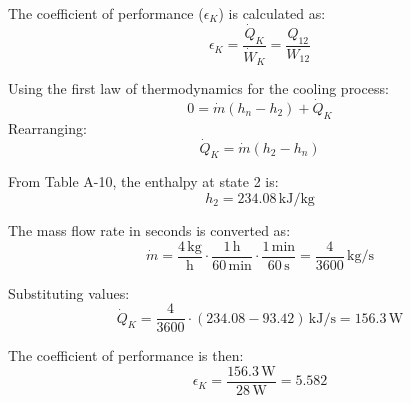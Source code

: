 The coefficient of performance (\( \epsilon_K \)) is calculated as:  
\[
\epsilon_K = \frac{\dot{Q}_K}{\dot{W}_K} = \frac{Q_{12}}{W_{12}}
\]  

Using the first law of thermodynamics for the cooling process:  
\[
0 = \dot{m} (h_n - h_2) + \dot{Q}_K
\]  
Rearranging:  
\[
\dot{Q}_K = \dot{m} (h_2 - h_n)
\]  

From Table A-10, the enthalpy at state 2 is:  
\[
h_2 = 234.08 \, \text{kJ/kg}
\]  

The mass flow rate in seconds is converted as:  
\[
\dot{m} = \frac{4 \, \text{kg}}{\text{h}} \cdot \frac{1 \, \text{h}}{60 \, \text{min}} \cdot \frac{1 \, \text{min}}{60 \, \text{s}} = \frac{4}{3600} \, \text{kg/s}
\]  

Substituting values:  
\[
\dot{Q}_K = \frac{4}{3600} \cdot (234.08 - 93.42) \, \text{kJ/s} = 156.3 \, \text{W}
\]  

The coefficient of performance is then:  
\[
\epsilon_K = \frac{156.3 \, \text{W}}{28 \, \text{W}} = 5.582
\]